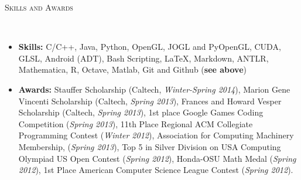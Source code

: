 \documentclass[9pt]{article}
\newenvironment{changemargin}[2]{%
  \begin{list}{}{%
    \setlength{\topsep}{0pt}%
    \setlength{\leftmargin}{#1}%
    \setlength{\rightmargin}{#2}%
    \setlength{\listparindent}{\parindent}%
    \setlength{\itemindent}{\parindent}%
    \setlength{\parsep}{\parskip}%
  }%
  \item[]}{\end{list}
}
\newcommand{\lineover}{
	\begin{changemargin}{-0.05in}{-0.05in}
		\vspace*{-8pt}
		\hrulefill \\
		\vspace*{-2pt}
	\end{changemargin}
}
\newcommand{\header}[1]{
	\begin{changemargin}{-0.5in}{-0.5in}
		\scshape{#1}\\
  	\lineover
	\end{changemargin}
}
\newenvironment{body} {
	\vspace*{-16pt}
	\begin{changemargin}{-0.25in}{-0.5in}
  }	
	{\end{changemargin}
}
\begin{document}
\header{Skills and Awards}
\smallskip
\begin{body}
	\vspace{14pt}
	
	\begin{itemize} \itemsep -0pt
	
	\item \textbf{Skills:} C/C++, Java, Python, OpenGL, JOGL and PyOpenGL, CUDA, GLSL, Android (ADT), Bash Scripting, \LaTeX, Markdown, ANTLR,  Mathematica, R, Octave, Matlab, Git and Github (\textbf{see above})\\
	\medskip
	\item \textbf{Awards:} Stauffer Scholarship (Caltech, \emph{Winter-Spring 2014}), Marion Gene Vincenti Scholarship (Caltech, \emph{Spring 2013}),
        Frances and Howard Vesper Scholarship (Caltech, \emph{Spring 2013}),
        1st place Google Games Coding Competition (\emph{Spring 2013}),
        11th Place Regional ACM Collegiate Programming Contest (\emph{Winter 2012}),
        Association for Computing Machinery Membership, (\emph{Spring 2013}),
        Top 5 in Silver Division on USA Computing Olympiad US Open Contest (\emph{Spring 2012}),
        Honda-OSU Math Medal (\emph{Spring 2012}),
        1st Place American Computer Science League Contest (\emph{Spring 2012}).
	\end{itemize}
\end{body}
\end{document}
